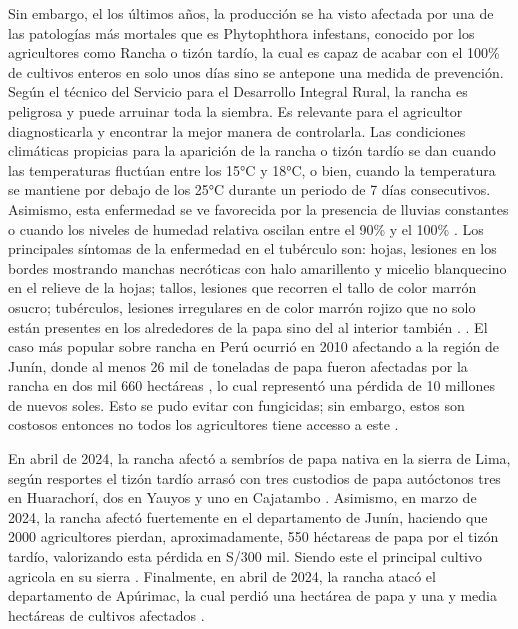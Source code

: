  Sin embargo, el los últimos años, la producción se ha visto afectada por una de las patologías más mortales que es Phytophthora infestans, conocido por los agricultores como Rancha o tizón tardío, la cual es capaz de acabar con el 100\% de cultivos enteros en solo unos días sino se antepone una medida de prevención. Según el técnico del Servicio para el Desarrollo Integral Rural,   la rancha es peligrosa y puede arruinar  toda la siembra. Es relevante para el agricultor diagnosticarla y encontrar la mejor manera de controlarla. Las condiciones climáticas propicias para la aparición de la rancha o tizón tardío se dan cuando las temperaturas fluctúan entre los 15°C y 18°C, o bien, cuando la temperatura se mantiene por debajo de los 25°C durante un periodo de 7 días consecutivos. Asimismo, esta enfermedad se ve favorecida por la presencia de lluvias constantes o cuando los niveles de humedad relativa oscilan entre el 90\% y el 100\% \parencite{cr_rancha1}. Los principales síntomas de la enfermedad en el tubérculo son: hojas, lesiones en los bordes mostrando manchas necróticas con halo amarillento y micelio blanquecino en el relieve de la hojas; tallos, lesiones que recorren el tallo de color marrón osucro; tubérculos, lesiones irregulares en de color marrón rojizo que no solo están presentes en los alrededores de la papa sino del al interior también \parencite{cr_rancha2}. . El caso más popular sobre rancha en Perú ocurrió en 2010 afectando a la región de Junín, donde al menos 26 mil de toneladas de papa fueron afectadas por la rancha en dos mil 660 hectáreas , lo cual representó una pérdida de 10 millones de nuevos soles. Esto se pudo evitar con fungicidas; sin embargo, estos son costosos entonces no todos los agricultores tiene accesso a este \parencite{cr_rancha6}. 
 
 En abril de 2024, la rancha afectó a sembríos de papa nativa en la sierra de Lima, según resportes el tizón tardío arrasó con tres custodios de papa autóctonos tres en Huarachorí, dos en Yauyos y uno en Cajatambo \parencite{cr_rancha3}. Asimismo, en marzo de 2024, la rancha afectó fuertemente en el departamento de Junín, haciendo que 2000 agricultores pierdan, aproximadamente, 550 héctareas de papa por el tizón tardío, valorizando esta pérdida en S/300 mil. Siendo este el principal cultivo agricola en su sierra \parencite{cr_rancha4}. Finalmente, en abril de 2024, la rancha atacó el departamento de Apúrimac, la cual perdió una hectárea de papa y una y media hectáreas de cultivos afectados \parencite{cr_rancha5}.
 
